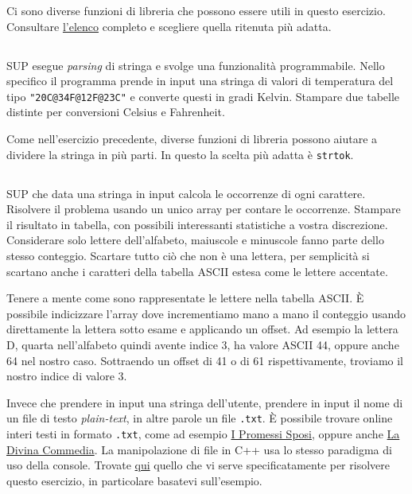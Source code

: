 \documentclass{article}
\begin{document}
\begin{info}
	Ci sono diverse funzioni di libreria che possono essere utili in questo esercizio. Consultare \href{www.cplusplus.com/reference/cstring/}{l'elenco} completo e scegliere quella ritenuta più adatta.
\end{info}

\subsection{}
SUP esegue \textit{parsing} di stringa e svolge una funzionalità programmabile. Nello specifico il programma prende in input una stringa di valori di temperatura del tipo \texttt{"20C@34F@12F@23C"} e converte questi in gradi Kelvin. Stampare due tabelle distinte per conversioni Celsius e Fahrenheit.
\begin{info}
	Come nell'esercizio precedente, diverse funzioni di libreria possono aiutare a dividere la stringa in più parti. In questo la scelta più adatta è \texttt{strtok}.
\end{info}

\clearpage

\subsection{}
SUP che data una stringa in input calcola le occorrenze di ogni carattere. Risolvere il problema usando un unico array per contare le occorrenze. Stampare il risultato in tabella, con possibili interessanti statistiche a vostra discrezione. Considerare solo lettere dell'alfabeto, maiuscole e minuscole fanno parte dello stesso conteggio. Scartare tutto ciò che non è una lettera, per semplicità si scartano anche i caratteri della tabella ASCII estesa come le lettere accentate.
\begin{info}
	Tenere a mente come sono rappresentate le lettere nella tabella ASCII. È possibile indicizzare l'array dove incrementiamo mano a mano il conteggio usando direttamente la lettera sotto esame e applicando un offset. Ad esempio la lettera D, quarta nell'alfabeto quindi avente indice 3, ha valore ASCII 44, oppure anche 64 nel nostro caso. Sottraendo un offset di 41 o di 61 rispettivamente, troviamo il nostro indice di valore 3.
\end{info}
\begin{warn} 
	Invece che prendere in input una stringa dell'utente, prendere in input il nome di un file di testo \textit{plain-text}, in altre parole un file \texttt{.txt}. È possibile trovare online interi testi in formato \texttt{.txt}, come ad esempio \href{http://rosada.yolasite.com/resources/i_promessi%20spo unsi.txt}{I Promessi Sposi}, oppure anche \href{https://www.google.com/url?sa=t&rct=j&q=&esrc=s&source=web&cd=&ved=2ahUKEwjEuuHktontAhWQa8AKHdv_D3AQFjAAegQIBBAC&url=http%3A%2F%2Fwww.hoepliscuola.it%2Fdownload%2F2842%2Fla-divina-commedia-txt.aspx&usg=AOvVaw2-ivHQ7MdppenKh_hOjUeB}{La Divina Commedia}. La manipolazione di file in C++ usa lo stesso paradigma di uso della console. Trovate \href{http://www.cplusplus.com/reference/istream/istream/get/}{qui} quello che vi serve specificatamente per risolvere questo esercizio, in particolare basatevi sull'esempio.
\end{warn}
\end{document}
